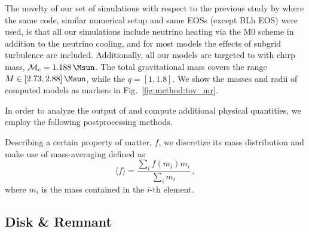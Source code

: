 %

The novelty of our set of simulations with 
respect to the previous study by \citet{Radice:2018pdn} where the same code,
similar numerical setup and same \acp{EOS} (except BLh \ac{EOS}) were used, 
is that all our simulations include neutrino heating via the 
M0 scheme in addition to the neutrino cooling, 
and for most models the effects of subgrid turbulence  
are included.  %
Additionally, all our models are targeted to \GW{} 
with chirp mass, $\mathcal{M}_c = 1.188\,\Msun$.   
The total gravitational mass covers 
the range $M\in[2.73, 2.88]\,\Msun$, while the \mr{} $q=[1,1.8]$. 
%
We show the masses and radii of computed models as markers in 
Fig.~\ref{fig:method:tov_mr}.

In order to analyze the output of \wisky{} and compute 
additional physical quantities, we employ the following 
postprocessing methods. 



Describing a certain property of matter, $f$, we discretize its 
mass distribution and make use of mass-averaging defined as 
%
\begin{equation}
\label{eq:ppr:average}
\langle f \rangle = \frac{\sum_i f(m_i)m_i}{\sum_i m_i}\, ,
\end{equation}
%
where $m_i$ is the mass contained in the $i$-th element.



\subsection{Disk \& Remnant}\label{sec:bns_sims:method:disk}

